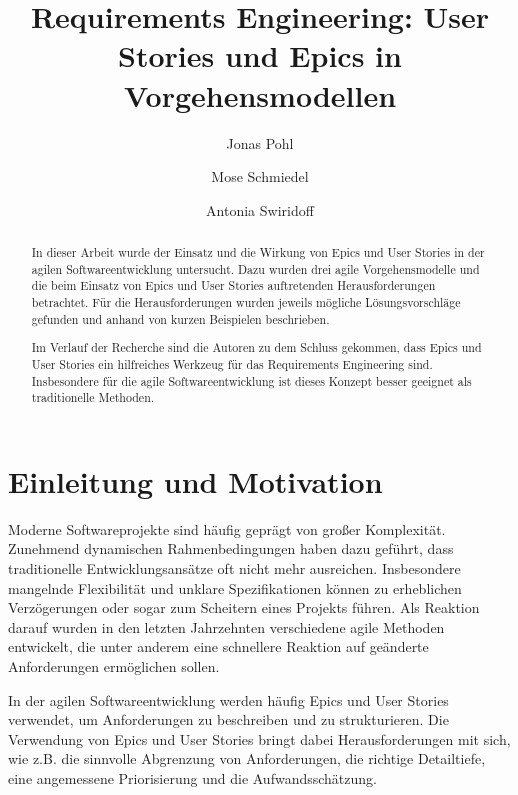 \documentclass[acmtog]{acmart}
\begin{document}
\hypersetup{
	colorlinks,
	allcolors=blue,
	citecolor=.,
}

\title{Requirements Engineering: User Stories und Epics in Vorgehensmodellen}

\author{Jonas Pohl}
\author{Mose Schmiedel}
\authornotemark[1]
\author{Antonia Swiridoff}
\authornotemark[1]

\renewcommand{\shortauthors}{Pohl, Schmiedel and Swiridoff}

\begin{abstract}
	In dieser Arbeit wurde der Einsatz und die Wirkung von Epics und User Stories in der agilen Softwareentwicklung untersucht.
	Dazu wurden drei agile Vorgehensmodelle und die beim Einsatz von Epics und User Stories
	auftretenden Herausforderungen betrachtet.
	Für die Herausforderungen wurden jeweils mögliche Lösungsvorschläge gefunden und anhand von kurzen Beispielen beschrieben.

	Im Verlauf der Recherche sind die Autoren zu dem Schluss gekommen, dass Epics und User Stories ein hilfreiches Werkzeug
	für das Requirements Engineering sind. Insbesondere für die agile Softwareentwicklung ist dieses Konzept besser geeignet als traditionelle
	Methoden.
\end{abstract}

\maketitle

\section{Einleitung und Motivation}
Moderne Softwareprojekte sind häufig geprägt von großer Komplexität.
Zunehmend dynamischen Rahmenbedingungen haben dazu geführt, dass traditionelle Entwicklungsansätze oft nicht mehr ausreichen.
Insbesondere mangelnde Flexibilität und unklare Spezifikationen können zu erheblichen Verzögerungen oder sogar zum Scheitern eines Projekts führen.
Als Reaktion darauf wurden in den letzten Jahrzehnten verschiedene agile Methoden entwickelt, die unter anderem eine schnellere Reaktion auf geänderte Anforderungen ermöglichen sollen.

In der agilen Softwareentwicklung werden häufig Epics und User Stories verwendet, um Anforderungen zu beschreiben und zu strukturieren.
Die Verwendung von Epics und User Stories bringt dabei Herausforderungen mit sich, wie z.B. die sinnvolle Abgrenzung von Anforderungen, die richtige Detailtiefe, eine angemessene Priorisierung und die Aufwandsschätzung.
\end{document}
